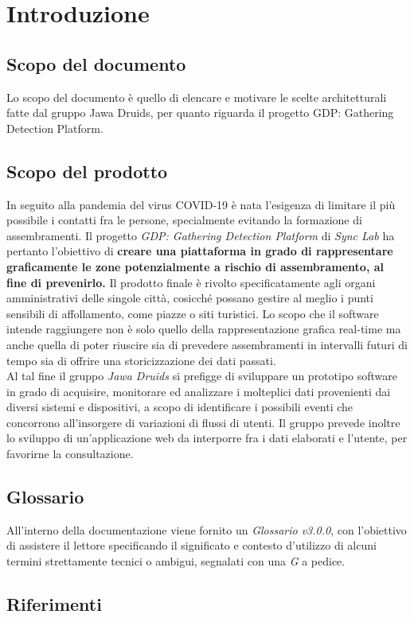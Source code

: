 \chapter{Introduzione}

\section{Scopo del documento}
Lo scopo del documento è quello di elencare e motivare le scelte architetturali fatte dal gruppo Jawa Druids, per quanto riguarda il progetto GDP: Gathering Detection Platform. 
\section{Scopo del prodotto}
In seguito alla pandemia del virus COVID-19 è nata l'esigenza di limitare il più possibile i contatti fra le persone, specialmente evitando la formazione di assembramenti. Il progetto \textit{GDP: Gathering Detection Platform} di \textit{Sync Lab} ha pertanto l'obiettivo di \textbf{creare una piattaforma in grado di rappresentare graficamente le zone potenzialmente a rischio di assembramento, al fine di prevenirlo.}
Il prodotto finale è rivolto specificatamente agli organi amministrativi delle singole città, cosicché possano gestire al meglio i punti sensibili di affollamento, come piazze o siti turistici.
Lo scopo che il software intende raggiungere non è solo quello della rappresentazione grafica real-time ma anche quella di poter riuscire sia di prevedere assembramenti in intervalli futuri di tempo sia di offrire una storicizzazione dei dati passati. \\
Al tal fine il gruppo \textit{Jawa Druids} si prefigge di sviluppare un prototipo software in grado di acquisire, monitorare ed analizzare i molteplici dati provenienti dai diversi sistemi e dispositivi, a scopo di identificare i possibili eventi che concorrono all’insorgere di variazioni di flussi di utenti. Il gruppo prevede inoltre lo sviluppo di un'applicazione web da interporre fra i dati elaborati e l'utente, per favorirne la consultazione.
\section{Glossario}
All'interno della documentazione viene fornito un \textit{Glossario v3.0.0}, con l'obiettivo di assistere il lettore specificando il significato e contesto d'utilizzo di alcuni termini strettamente tecnici o ambigui, segnalati con una \textit{G} a pedice.
\section{Riferimenti}\label{IntroduzioneRiferimenti}
